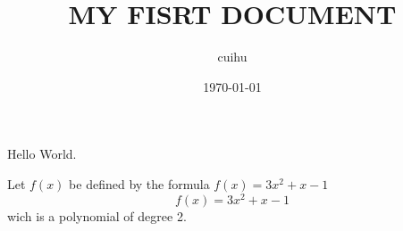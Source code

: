 \documentclass{article} %
\title{MY FISRT DOCUMENT}
\author{cuihu}
\date{\today}
\begin{document}
	\maketitle
	Hello World.
	
	Let $f(x)$ be defined by the formula 
	$f(x)=3x^2+x-1$
	$$f(x)=3x^2+x-1$$  %
	wich is a polynomial of degree 2.
\end{document}
